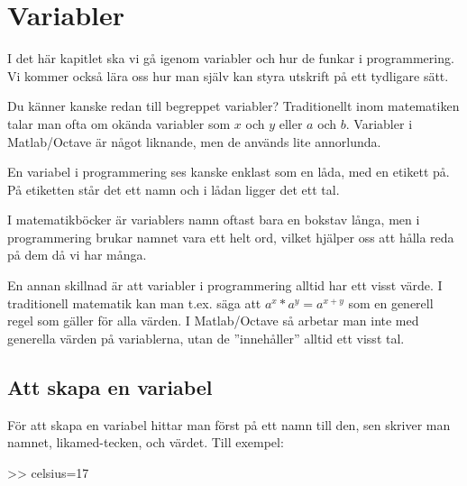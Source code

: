 %
%

\chapter{Variabler}\label{ch:variabler}

I det här kapitlet ska vi gå igenom variabler och hur de funkar i programmering. Vi kommer också lära oss hur man själv kan styra utskrift på ett tydligare sätt.

Du känner kanske redan till begreppet variabler? Traditionellt inom matematiken talar man ofta om okända variabler som $x$ och $y$ eller $a$ och $b$. Variabler i Matlab/Octave är något liknande, men de används lite annorlunda.

En variabel i programmering ses kanske enklast som en låda, med en etikett på. På etiketten står det ett namn och i lådan ligger det ett tal.

I matematikböcker är variablers namn oftast bara en bokstav långa, men i programmering brukar namnet vara ett helt ord, vilket hjälper oss att hålla reda på dem då vi har många.

En annan skillnad är att variabler i programmering alltid har ett visst värde. I traditionell matematik kan man t.ex. säga att $a^x*a^y=a^{x+y}$ som en generell regel som gäller för alla värden. I Matlab/Octave så arbetar man inte med generella värden på variablerna, utan de ''innehåller'' alltid ett visst tal.


\section{Att skapa en variabel}
För att skapa en variabel hittar man först på ett namn till den, sen skriver man namnet, likamed-tecken, och värdet. Till exempel:
\begin{matlab}[caption={Skapa variabeln celsius},label={}]
>> celsius=17
\end{matlab}

